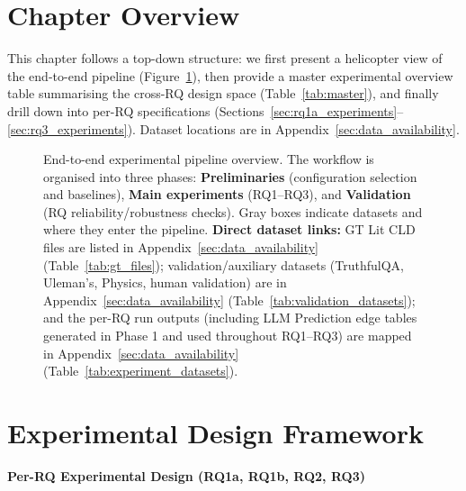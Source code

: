 \section{Chapter Overview}
\label{sec:exp_chapter_overview}

This chapter follows a top-down structure: we first present a helicopter view of the end-to-end pipeline (Figure~\ref{fig:experimental_pipeline_overview}), then provide a master experimental overview table summarising the cross-RQ design space (Table~\ref{tab:master}), and finally drill down into per-RQ specifications (Sections~\ref{sec:rq1a_experiments}--\ref{sec:rq3_experiments}). Dataset locations are in Appendix~\ref{sec:data_availability}.

\begin{figure}[H]
\centering
\resizebox{1.0\textwidth}{!}{%

}
\caption[End-to-end experimental pipeline overview.]{End-to-end experimental pipeline overview. The workflow is organised into three phases: \textbf{Preliminaries} (configuration selection and baselines), \textbf{Main experiments} (RQ1--RQ3), and \textbf{Validation} (RQ reliability/robustness checks). Gray boxes indicate datasets and where they enter the pipeline. \textbf{Direct dataset links:} GT Lit CLD files are listed in Appendix~\ref{sec:data_availability} (Table~\ref{tab:gt_files}); validation/auxiliary datasets (TruthfulQA, Uleman's, Physics, human validation) are in Appendix~\ref{sec:data_availability} (Table~\ref{tab:validation_datasets}); and the per-RQ run outputs (including LLM Prediction edge tables generated in Phase 1 and used throughout RQ1--RQ3) are mapped in Appendix~\ref{sec:data_availability} (Table~\ref{tab:experiment_datasets}).}
\label{fig:experimental_pipeline_overview}
\end{figure}

\section{Experimental Design Framework}

\noindent\textbf{Per-RQ Experimental Design (RQ1a, RQ1b, RQ2, RQ3)}
\label{sec:per_rq_design}

